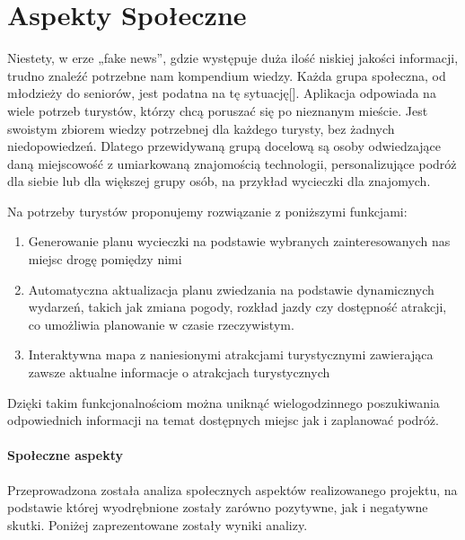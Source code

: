 

\section{Aspekty Społeczne}
\label{subsec:aspekty-spoleczne}



 \indent Niestety, w erze „fake news”, gdzie występuje duża ilość niskiej jakości informacji, trudno znaleźć potrzebne nam kompendium wiedzy. Każda grupa społeczna, od młodzieży do seniorów, jest podatna na tę sytuację[].
Aplikacja odpowiada na wiele potrzeb turystów, którzy chcą poruszać się po nieznanym mieście. Jest swoistym zbiorem wiedzy potrzebnej dla każdego turysty, bez żadnych niedopowiedzeń. Dlatego przewidywaną grupą docelową są osoby odwiedzające daną miejscowość z umiarkowaną znajomością technologii, personalizujące podróż dla siebie lub dla większej grupy osób, na przykład wycieczki dla znajomych.



\indent Na potrzeby turystów proponujemy rozwiązanie z poniższymi funkcjami:

\begin{enumerate}
   \item 	Generowanie planu wycieczki na podstawie wybranych zainteresowanych nas miejsc drogę pomiędzy nimi
   \item 	Automatyczna aktualizacja planu zwiedzania na podstawie dynamicznych wydarzeń, takich jak zmiana pogody, rozkład jazdy czy dostępność atrakcji, co umożliwia planowanie w czasie rzeczywistym.
   \item	Interaktywna mapa z naniesionymi atrakcjami turystycznymi zawierająca zawsze aktualne informacje o atrakcjach turystycznych
\end{enumerate}

\indent Dzięki takim funkcjonalnościom można uniknąć wielogodzinnego poszukiwania odpowiednich informacji na temat dostępnych miejsc jak i zaplanować podróż.

\paragraph*{Społeczne aspekty}

\indent Przeprowadzona została analiza społecznych aspektów realizowanego projektu, na podstawie której wyodrębnione zostały zarówno pozytywne, jak i negatywne skutki.  Poniżej zaprezentowane zostały wyniki analizy.

